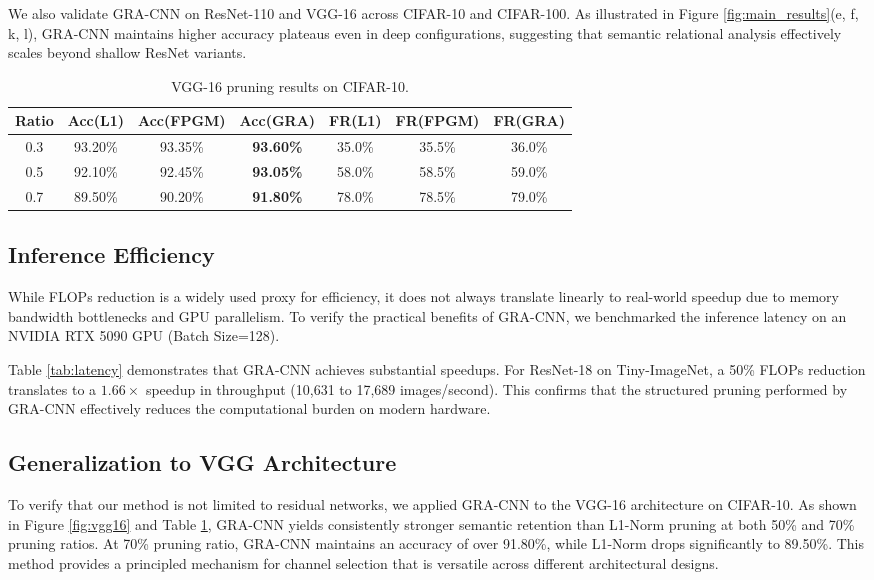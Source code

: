 \documentclass[sn-mathphys,Numbered]{sn-jnl}
\begin{document}
We also validate GRA-CNN on ResNet-110 and VGG-16 across CIFAR-10 and CIFAR-100. As illustrated in Figure \ref{fig:main_results}(e, f, k, l), GRA-CNN maintains higher accuracy plateaus even in deep configurations, suggesting that semantic relational analysis effectively scales beyond shallow ResNet variants.



\begin{table}[h]
\centering
\caption{VGG-16 pruning results on CIFAR-10.}
\label{tab:vgg16_results}
\begin{tabular}{c|ccc|ccc}
\toprule
Ratio & Acc(L1) & Acc(FPGM) & Acc(GRA) & FR(L1) & FR(FPGM) & FR(GRA) \\
\midrule
0.3 & 93.20\% & 93.35\% & \textbf{93.60\%} & 35.0\% & 35.5\% & 36.0\% \\
0.5 & 92.10\% & 92.45\% & \textbf{93.05\%} & 58.0\% & 58.5\% & 59.0\% \\
0.7 & 89.50\% & 90.20\% & \textbf{91.80\%} & 78.0\% & 78.5\% & 79.0\% \\
\bottomrule
\end{tabular}
\end{table}

\subsection{Inference Efficiency}
While FLOPs reduction is a widely used proxy for efficiency, it does not always translate linearly to real-world speedup due to memory bandwidth bottlenecks and GPU parallelism. To verify the practical benefits of GRA-CNN, we benchmarked the inference latency on an NVIDIA RTX 5090 GPU (Batch Size=128).



Table \ref{tab:latency} demonstrates that GRA-CNN achieves substantial speedups. For ResNet-18 on Tiny-ImageNet, a 50\% FLOPs reduction translates to a $1.66\times$ speedup in throughput (10,631 to 17,689 images/second). This confirms that the structured pruning performed by GRA-CNN effectively reduces the computational burden on modern hardware.

\subsection{Generalization to VGG Architecture}
To verify that our method is not limited to residual networks, we applied GRA-CNN to the VGG-16 architecture on CIFAR-10. As shown in Figure \ref{fig:vgg16} and Table \ref{tab:vgg16_results}, GRA-CNN yields consistently stronger semantic retention than L1-Norm pruning at both 50\% and 70\% pruning ratios. At 70\% pruning ratio, GRA-CNN maintains an accuracy of over 91.80\%, while L1-Norm drops significantly to 89.50\%. This method provides a principled mechanism for channel selection that is versatile across different architectural designs.
\end{document}
